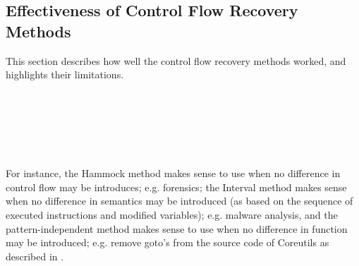 
\subsection{Effectiveness of Control Flow Recovery Methods}

This section describes how well the control flow recovery methods worked, and highlights their limitations.

 \\

 \\
 \\
 \\

For instance, the Hammock method makes sense to use when no difference in control flow may be introduces; e.g. forensics; the Interval method makes sense when no difference in semantics may be introduced (as based on the sequence of executed instructions and modified variables); e.g. malware analysis, and the pattern-independent method makes sense to use when no difference in function may be introduced; e.g. remove goto's from the source code of Coreutils as described in \cite{no_more_gotos}.
